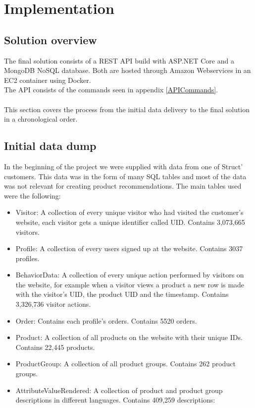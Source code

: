 
\chapter{Implementation} %

\label{Chapter5} %


\section{Solution overview}

The final solution consists of a \gls{REST} API build with ASP.NET Core and a MongoDB \gls{NoSQL} database. Both are hosted through Amazon Webservices in an EC2 container using Docker. \\
The API consists of the commands seen in appendix \ref{APICommands}. \\\\

This section covers the process from the initial data delivery to the final solution in a chronological order.

\section{Initial data dump}
In the beginning of the project we were supplied with data from one of \gls{Struct}' customers. This data was in the form of many SQL tables and most of the data was not relevant for creating product recommendations. The main tables used were the following:  \\
\begin{itemize}
\item Visitor: A collection of every unique visitor who had visited the customer's website, each visitor gets a unique identifier called UID. Contains 3,073,665  visitors.
\item Profile: A collection of every users signed up at the website. Contains 3037 profiles.
\item BehaviorData: A collection of every unique action performed by visitors on the website, for example when a visitor views a product a new row is made with the visitor's UID, the product UID and the timestamp. Contains 3,326,736 visitor actions.
\item Order: Contains each profile's orders. Contains 5520 orders.
\item Product: A collection of all products on the website with their unique IDs. Contains 22,445 products.
\item ProductGroup: A collection of all product groups. Contains 262 product groups.
\item AttributeValueRendered: A collection of product and product group descriptions in different languages. Contains 409,259 descriptions:

\end{itemize}

